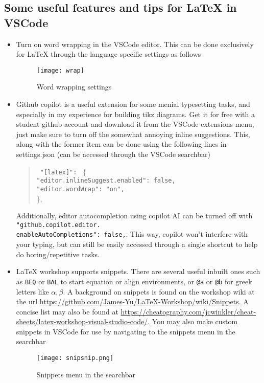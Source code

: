 \newpage
\subsection{Some useful features and tips for \LaTeX{} in VSCode}
\begin{itemize}
    \item Turn on word wrapping in the VSCode editor. This can be done exclusively for \LaTeX{} through the language specific settings as follows
    \begin{figure}[ht!]
        \centering
        \texttt{[image: wrap]}
        \caption{Word wrapping settings}
    \end{figure}
    \item Github copilot is a useful extension for some menial typesetting tasks, and especially in my experience for building tikz diagrams. Get it for free with a student github account and download it from the VSCode extensions menu, just make sure to turn off the somewhat annoying inline suggestions. This, along with the former item can be done using the following lines in settings.json (can be accessed through the VSCode searchbar)
    \begin{quote}
        \texttt{      
            "[latex]": } \{ \texttt{\\
                "editor.inlineSuggest.enabled": false,\\
                "editor.wordWrap": "on",\\
            }\},
    \end{quote}
    Additionally, editor autocompletion using copilot AI can be turned off with \texttt{"github.copilot.editor.\\enableAutoCompletions": false,}. This way, copilot won't interfere with your typing, but can still be easily accessed through a single shortcut to help do boring/repetitive tasks.

    \item LaTeX workshop supports snippets. There are several useful inbuilt ones such as \verb|BEQ| or \verb|BAL| to start equation or align environments, or \verb|@a| or \verb|@b| for greek letters like $\alpha,\beta$. A background on snippets is found on the workshop wiki at the url \url{https://github.com/James-Yu/LaTeX-Workshop/wiki/Snippets}. A concise list may also be found at \url{https://cheatography.com/jcwinkler/cheat-sheets/latex-workshop-visual-studio-code/}. You may also make custom snippets in VSCode for use by navigating to the snippets menu in the searchbar
    \begin{figure}[ht!]
        \centering
        \texttt{[image: snipsnip.png]}
        \caption{Snippets menu in the searchbar}
    \end{figure}
    

\end{itemize}
